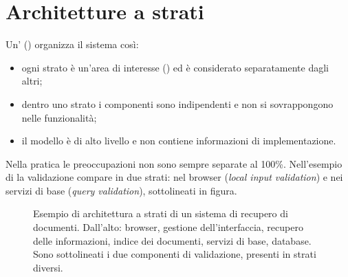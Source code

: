 \section{Architetture a strati}
\label{sec:arch-strati}

Un' () organizza il sistema così:
\begin{itemize}
  \item ogni strato è un'area di interesse () ed è considerato separatamente dagli altri;
  \item dentro uno strato i componenti sono indipendenti e non si sovrappongono nelle funzionalità;
  \item il modello è di alto livello e non contiene informazioni di implementazione.
\end{itemize}
Nella pratica le preoccupazioni non sono sempre separate al 100\%. Nell'esempio di  la
validazione compare in due strati: nel browser (\emph{local input validation}) e nei servizi di base
(\emph{query validation}), sottolineati in figura.

\begin{figure}[ht]
\centering
{}
\caption{Esempio di architettura a strati di un sistema di recupero di documenti. Dall'alto: browser, gestione
dell'interfaccia, recupero delle informazioni, indice dei documenti, servizi di base, database. Sono sottolineati i
due componenti di validazione, presenti in strati diversi.}
\label{fig:arch-strati}
\end{figure}

